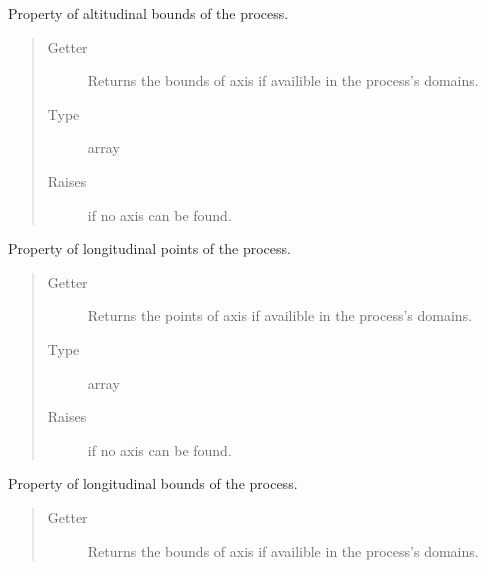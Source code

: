 \documentclass[a4paper,10pt,english]{sphinxmanual}
\begin{document}
\begin{fulllineitems}
\begin{fulllineitems}
\end{fulllineitems}


\begin{fulllineitems}
\label{api/climlab.process:climlab.process.process.Process.lev_bounds}
Property of altitudinal bounds of the process.
\begin{quote}\begin{description}
\item[{Getter}] \leavevmode
Returns the bounds of axis  if availible in the
process's domains.

\item[{Type}] \leavevmode
array

\item[{Raises}] \leavevmode
{}
if no  axis can be found.

\end{description}\end{quote}

\end{fulllineitems}


\begin{fulllineitems}
\label{api/climlab.process:climlab.process.process.Process.lon}
Property of longitudinal points of the process.
\begin{quote}\begin{description}
\item[{Getter}] \leavevmode
Returns the points of axis  if availible in the
process's domains.

\item[{Type}] \leavevmode
array

\item[{Raises}] \leavevmode
{}
if no  axis can be found.

\end{description}\end{quote}

\end{fulllineitems}


\begin{fulllineitems}
\label{api/climlab.process:climlab.process.process.Process.lon_bounds}
Property of longitudinal bounds of the process.
\begin{quote}\begin{description}
\item[{Getter}] \leavevmode
Returns the bounds of axis  if availible in the
process's domains.


\end{description}
\end{quote}
\end{fulllineitems}
\end{fulllineitems}
\end{document}
